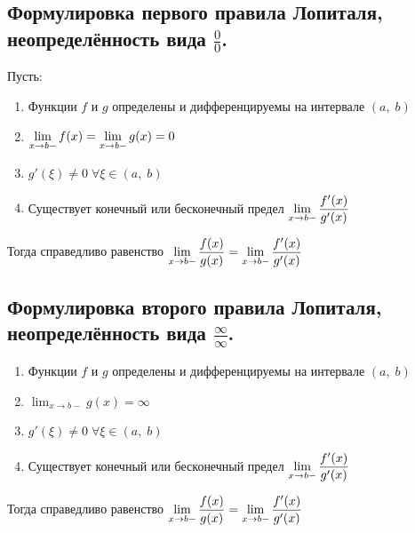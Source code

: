 

\label{sec_Definition14}
\begin{definition}
    \subsection*{Формулировка первого правила Лопиталя, 
                 неопределённость вида $\frac{0}{0}$.}
    \begin{note}[purple]
        Пусть:
        \begin{enumerate}
            \item Функции $f$ и $g$ определены и дифференцируемы на интервале $(a, \; b)$
            \item $ \displaystyle \lim_{x \rightarrow b-} f(x) = \lim_{x \rightarrow b-} g(x) = 0 $
            \item $g'(\xi) \neq 0 \; \forall \xi \in (a, \; b)$
            \item Существует конечный или бесконечный предел 
            $\displaystyle \lim_{x \rightarrow b-} \frac{f'(x)}{g'(x)}$
        \end{enumerate}
        Тогда справедливо равенство 
        $\displaystyle \lim_{x \rightarrow b-} \frac{f(x) }{g(x) } = 
                       \lim_{x \rightarrow b-} \frac{f'(x)}{g'(x)} $
    \end{note}

    \subsection*{Формулировка второго правила Лопиталя,
                 неопределённость вида $\frac{\infty}{\infty}$.}
    \begin{note}[purple]
        \begin{enumerate}
            \item Функции $f$ и $g$ определены и дифференцируемы на интервале $(a, \; b)$
            \item $\lim_{x \rightarrow b-} g(x) = \infty$
            \item $g'(\xi) \neq 0 \; \forall \xi \in (a, \; b)$
            \item Существует конечный или бесконечный предел 
            $\displaystyle \lim_{x \rightarrow b-} \frac{f'(x)}{g'(x)}$
        \end{enumerate}
        Тогда справедливо равенство $\displaystyle \lim_{x \rightarrow b-} \frac{f(x)} {g(x)} = 
                                         \lim_{x \rightarrow b-} \frac{f'(x)}{g'(x)}$
    \end{note}
\end{definition}